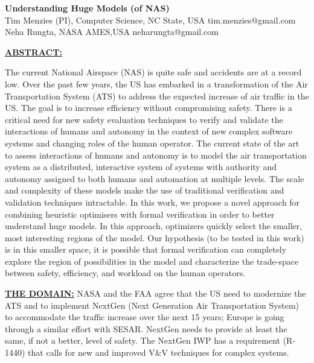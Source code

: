 \documentclass[12pt]{article}
\begin{document}
 
\begin{center}
{\Large {\bf  Understanding Huge  Models (of NAS)}}\\
Tim Menzies (PI), Computer Science, NC State, USA tim.menzies@gmail.com\\ 
Neha Rungta,  NASA AMES,USA  neharungta@gmail.com
\end{center}
\noindent
\underline{{\bf ABSTRACT:}}  

The current National Airspace (NAS) is quite safe and accidents are at a record low. Over the past few years, the US has embarked in a transformation of the Air Transportation System (ATS) to address the expected increase of air traffic in the US. The goal is to increase efficiency without compromising safety. There is a critical need for new safety evaluation techniques to verify and validate the interactions of humans and autonomy in the context of new complex software systems and changing roles of the human operator. 
The current state of the art to assess interactions of humans and autonomy is to model the air transportation system as a distributed, interactive system of systems with authority and autonomy assigned to both humans and automation at multiple levels. The scale and complexity of these models make the use of traditional verification and validation techniques intractable. In this work, we propose a novel approach for combining heuristic optimisers with formal verification in order to better understand huge models. In this approach,  optimizers quickly select the smaller, most interesting regions of the model. Our hypothesis (to be tested in this work) is in this smaller space, it is possible that formal verification can completely explore the region of possibilities in the model and  characterize the trade-space between safety, efficiency, and workload on the human operators.

\underline{{\bf THE DOMAIN:}}
NASA and the FAA agree that the US need to modernize the ATS and to implement NextGen (Next Generation Air Transportation System) to accommodate the traffic increase over the next 15 years; Europe is going through a similar effort with SESAR. NextGen needs to provide at least the same, if not a better, level of safety. The  NextGen IWP has a requirement (R-1440) that calls for new and improved V\&V techniques for complex systems. 
\end{document}
